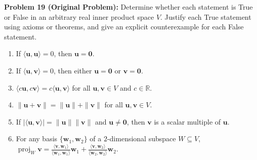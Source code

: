 \documentclass[11pt, letterpaper]{article}
\theoremstyle{definition}
\theoremstyle{remark}
\begin{document}
\textbf{Problem 19 (Original Problem):} Determine whether each statement is True or False in an arbitrary real inner product space $V$. Justify each True statement using axioms or theorems, and give an explicit counterexample for each False statement.
\begin{enumerate}[label=(\alph*)]
    \item If $\langle \mathbf{u}, \mathbf{u} \rangle = 0$, then $\mathbf{u} = \mathbf{0}$.
    \item If $\langle \mathbf{u}, \mathbf{v} \rangle = 0$, then either $\mathbf{u} = \mathbf{0}$ or $\mathbf{v} = \mathbf{0}$.
    \item $\langle c\mathbf{u}, c\mathbf{v} \rangle = c\langle \mathbf{u}, \mathbf{v} \rangle$ for all $\mathbf{u}, \mathbf{v} \in V$ and $c \in \mathbb{R}$.
    \item $\|\mathbf{u} + \mathbf{v}\| = \|\mathbf{u}\| + \|\mathbf{v}\|$ for all $\mathbf{u}, \mathbf{v} \in V$.
    \item If $|\langle \mathbf{u}, \mathbf{v} \rangle| = \|\mathbf{u}\|\|\mathbf{v}\|$ and $\mathbf{u} \neq \mathbf{0}$, then $\mathbf{v}$ is a scalar multiple of $\mathbf{u}$.
    \item For any basis $\{\mathbf{w}_1, \mathbf{w}_2\}$ of a $2$-dimensional subspace $W \subseteq V$, $\operatorname{proj}_W \mathbf{v} = \frac{\langle \mathbf{v}, \mathbf{w}_1 \rangle}{\langle \mathbf{w}_1, \mathbf{w}_1 \rangle}\mathbf{w}_1 + \frac{\langle \mathbf{v}, \mathbf{w}_2 \rangle}{\langle \mathbf{w}_2, \mathbf{w}_2 \rangle}\mathbf{w}_2$.
\end{enumerate}
\end{document}
